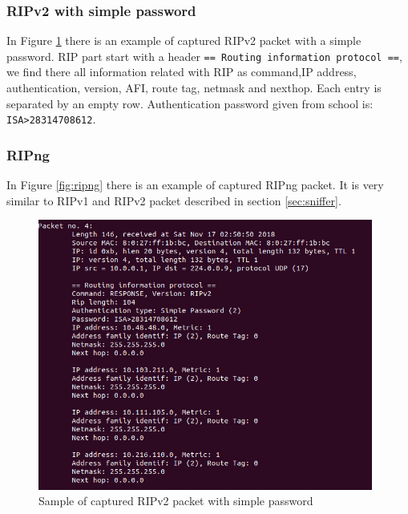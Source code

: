 \documentclass[11pt,a4paper]{article}
\begin{document}
\subsubsection{RIPv2 with simple password}
In Figure \ref{fig:simple_password} there is an example of captured RIPv2 packet with a simple password. RIP part start with a header \texttt{== Routing information protocol ==}, we find there all information related with RIP as command,IP address, authentication, version, AFI, route tag, netmask and nexthop. Each entry is separated by an empty row. Authentication password given from school is: \texttt{ISA>28314708612}.

\subsubsection{RIPng}
In Figure \ref{fig:ripng} there is an example of captured RIPng packet. It is very similar to RIPv1 and RIPv2 packet described in section \ref{sec:sniffer}.

\begin{figure}[H]
	
	\includegraphics[width=11cm]{img/simple_password.png} 
	\caption{Sample of captured RIPv2 packet with simple password}
	\label{fig:simple_password}

\end{figure}
\end{document}
